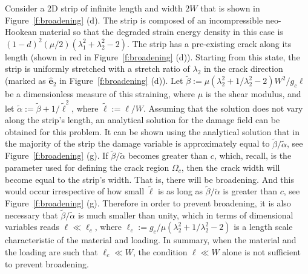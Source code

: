 \documentclass[10pt,letterpaper]{article}
\begin{document}
    Consider a 2D strip of infinite length and width $2W$ that is shown in Figure~\ref{f:broadening} (d).
    The strip is composed of an incompressible neo-Hookean material so that the degraded strain energy density in this case is $(1-d)^2 (\mu/2)(\lambda_1^2+\lambda_2^2-2)$.
    The strip has a pre-existing crack along its length (shown in red in Figure~\ref{f:broadening} (d)).
    Starting from this state, the strip is uniformly stretched with a stretch ratio of $\lambda_2$ in the crack direction (marked as $\hat{\mathbf{e}}_2$ in Figure~\ref{f:broadening} (d)).
    Let  $\tilde{\beta}:= \mu (\lambda_2^2+1/\lambda_2^2-2) W^2 /g_c  \ell$ be a dimensionless measure of this straining, where $\mu$ is the shear modulus, and let $\tilde{\alpha}:=\tilde{\beta}+1/\tilde{\ell}^{2}$, where $\tilde{\ell}:=\ell/W$.
    Assuming that the solution does not vary along the strip's length, an analytical solution for the damage field can be obtained for this problem.
    It can be shown using the analytical solution that in the majority of the strip the damage variable is approximately equal to $ \tilde{\beta}/\tilde{\alpha}$, see Figure~\ref{f:broadening} (g). If $ \tilde{\beta}/\tilde{\alpha}$ becomes greater than $c$, which, recall, is the parameter used for defining the crack region $\Omega_c$, then the crack width will become equal to the strip's width. That is, there will be broadening. And this would occur irrespective of how small $\tilde{\ell}$ is as long as $ \tilde{\beta}/\tilde{\alpha}$ is greater than $c$, see Figure~\ref{f:broadening} (g). Therefore in order to prevent broadening, it is also necessary that $\tilde{\beta}/\tilde{\alpha}$ is much smaller than unity, which in terms of dimensional variables reads $\ell \ll \ell_c$, where $\ell_c:=g_c/\mu (\lambda_2^2+1/\lambda_2^2-2)$ is a length scale characteristic of the material and loading.  In summary, when the material and the loading are such that $\ell_c\ll W$, the condition $\ell \ll W$ alone is not sufficient to prevent broadening.%
\end{document}
